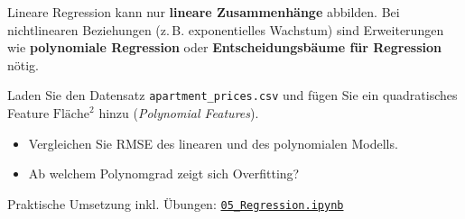 \begin{mycaution}
Lineare Regression kann nur \textbf{lineare Zusammenhänge} abbilden.
Bei nichtlinearen Beziehungen (z.\,B. exponentielles Wachstum) sind Erweiterungen wie
\textbf{polynomiale Regression} oder \textbf{Entscheidungsbäume für Regression} nötig.
\end{mycaution}

\begin{mychallenge}
Laden Sie den Datensatz \texttt{apartment\_prices.csv} und fügen Sie ein quadratisches
Feature $\text{Fläche}^2$ hinzu (\emph{Polynomial Features}).
\begin{itemize}
    \item Vergleichen Sie RMSE des linearen und des polynomialen Modells.
    \item Ab welchem Polynomgrad zeigt sich Overfitting?
\end{itemize}
\end{mychallenge}

\begin{myremark}[Notebook]
Praktische Umsetzung inkl. Übungen:
\href{\notebookbaseurl05_Regression_Prediction.ipynb}{\texttt{05\_Regression.ipynb}}
\end{myremark}
